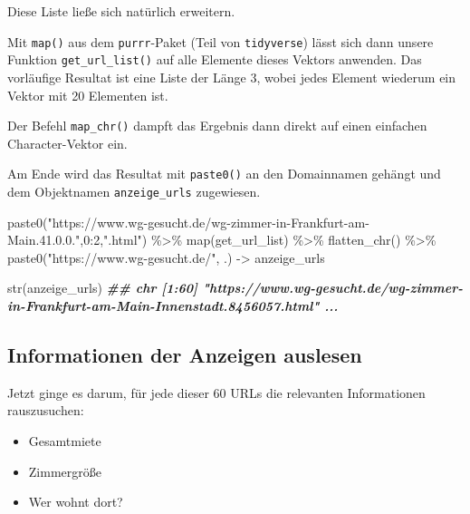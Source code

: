 \documentclass[
  ngerman,
]{article}
\newenvironment{Shaded}{\begin{snugshade}}{\end{snugshade}}
\newcommand{\DecValTok}[1]{\textcolor[rgb]{0.00,0.00,0.81}{#1}}
\newcommand{\DocumentationTok}[1]{\textcolor[rgb]{0.56,0.35,0.01}{\textbf{\textit{#1}}}}
\newcommand{\FunctionTok}[1]{\textcolor[rgb]{0.00,0.00,0.00}{#1}}
\newcommand{\NormalTok}[1]{#1}
\newcommand{\OtherTok}[1]{\textcolor[rgb]{0.56,0.35,0.01}{#1}}
\newcommand{\SpecialCharTok}[1]{\textcolor[rgb]{0.00,0.00,0.00}{#1}}
\newcommand{\StringTok}[1]{\textcolor[rgb]{0.31,0.60,0.02}{#1}}
\providecommand{\tightlist}{%
  \setlength{\itemsep}{0pt}\setlength{\parskip}{0pt}}
\begin{document}
Diese Liste ließe sich natürlich erweitern.

Mit \texttt{map()} aus dem \texttt{purrr}-Paket (Teil von \texttt{tidyverse}) lässt sich dann unsere Funktion \texttt{get\_url\_list()} auf alle Elemente dieses Vektors anwenden. Das vorläufige Resultat ist eine Liste der Länge 3, wobei jedes Element wiederum ein Vektor mit 20 Elementen ist.

Der Befehl \texttt{map\_chr()} dampft das Ergebnis dann direkt auf einen einfachen Character-Vektor ein.

Am Ende wird das Resultat mit \texttt{paste0()} an den Domainnamen gehängt und dem Objektnamen \texttt{anzeige\_urls} zugewiesen.

\begin{Shaded}
\begin{Highlighting}[]

\FunctionTok{paste0}\NormalTok{(}\StringTok{"https://www.wg{-}gesucht.de/wg{-}zimmer{-}in{-}Frankfurt{-}am{-}Main.41.0.0."}\NormalTok{,}\DecValTok{0}\SpecialCharTok{:}\DecValTok{2}\NormalTok{,}\StringTok{".html"}\NormalTok{) }\SpecialCharTok{\%\textgreater{}\%}
  \FunctionTok{map}\NormalTok{(get\_url\_list) }\SpecialCharTok{\%\textgreater{}\%}
  \FunctionTok{flatten\_chr}\NormalTok{() }\SpecialCharTok{\%\textgreater{}\%}
  \FunctionTok{paste0}\NormalTok{(}\StringTok{"https://www.wg{-}gesucht.de/"}\NormalTok{, .) }\OtherTok{{-}\textgreater{}}\NormalTok{ anzeige\_urls}

\FunctionTok{str}\NormalTok{(anzeige\_urls)}
\DocumentationTok{\#\#  chr [1:60] "https://www.wg{-}gesucht.de/wg{-}zimmer{-}in{-}Frankfurt{-}am{-}Main{-}Innenstadt.8456057.html" ...}
\end{Highlighting}
\end{Shaded}

\hypertarget{informationen-der-anzeigen-auslesen}{%
\subsection{Informationen der Anzeigen auslesen}\label{informationen-der-anzeigen-auslesen}}

Jetzt ginge es darum, für jede dieser 60 URLs die relevanten Informationen rauszusuchen:

\begin{itemize}
\tightlist
\item
  Gesamtmiete
\item
  Zimmergröße
\item
  Wer wohnt dort?
\end{itemize}
\end{document}

